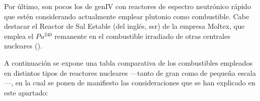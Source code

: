 Por último, son pocos los  de \acrshort{genIV} con reactores de espectro neutrónico rápido que estén considerando actualmente emplear plutonio como combustible. Cabe destacar el Reactor de Sal Estable (del inglés, \acrshort{ssr}) de la empresa Moltex, que emplea el $Pu^{240}$ remanente en el combustible irradiado de otras centrales nucleares (\cite{nea_smrs_2021}).

A continuación se expone una tabla comparativa de los combustibles empleados en distintos tipos de reactores nucleares ---tanto de gran como de pequeña escala---, en la cual se ponen de manifiesto las consideraciones que se han explicado en este apartado:

\begin{table}[h]
  \centering
\end{table}
